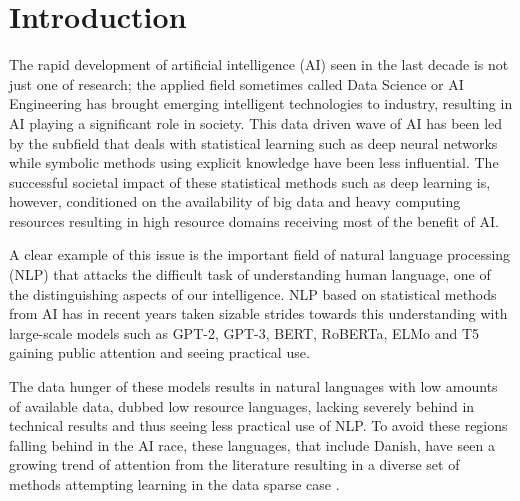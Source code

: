 \documentclass[main.tex]{subfiles}
\begin{document}
\chapter{Introduction}
The rapid development of artificial intelligence (AI) seen in the last decade is not just one of research;
the applied field sometimes called Data Science or AI Engineering has brought emerging intelligent technologies to industry, resulting in AI playing a significant role in society.  This data driven wave of AI has been led by the subfield that deals with statistical learning such as deep neural networks while symbolic methods using explicit knowledge have been less influential.
The successful societal impact of these statistical methods such as deep learning is, however, conditioned on the availability of big data and heavy computing resources resulting in high resource domains receiving most of the benefit of AI.

A clear example of this issue is the important field of natural language processing (NLP) that attacks the difficult task of understanding human language, one of the distinguishing aspects of our intelligence.
NLP based on statistical methods from AI has in recent years taken sizable strides towards this understanding with large-scale models such as GPT-2, GPT-3, BERT, RoBERTa, ELMo and T5 gaining public attention and seeing practical use.

The data hunger of these models results in natural languages with low amounts of available data, dubbed low resource languages, lacking severely behind in technical results and thus seeing less practical use of NLP.
To avoid these regions falling behind in the AI race, these languages, that include Danish, have seen a growing trend of attention from the literature resulting in a diverse set of methods attempting learning in the data sparse case \cite{hedderich2021survey}.
\end{document}
